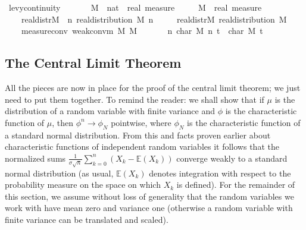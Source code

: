 \documentclass{article}
\theoremstyle{definition}
\renewcommand{\E}{\mathbb E}
\begin{document}
\begin{isabellebody}
\isamarkupfalse%
\ levy{\isacharunderscore}continuity{}{\isacharcolon}\isanewline
\ \ \isanewline
\ \ \ \ M\ {\isacharcolon}{\isacharcolon}\ {\isachardoublequoteopen}nat\ {\isasymRightarrow}\ real\ measure{\isachardoublequoteclose}\ \isanewline
\ \ \ \ M{\isacharprime}\ {\isacharcolon}{\isacharcolon}\ {\isachardoublequoteopen}real\ measure{\isachardoublequoteclose}\isanewline
\ \ \ \isanewline
\ \ \ \ real{\isacharunderscore}distr{\isacharunderscore}M\ {\isacharcolon}\ {\isachardoublequoteopen}{\isasymAnd}n{\isachardot}\ real{\isacharunderscore}distribution\ {\isacharparenleft}M\ n{\isacharparenright}{\isachardoublequoteclose}\ \isanewline
\ \ \ \ real{\isacharunderscore}distr{\isacharunderscore}M{\isacharprime}{\isacharcolon}\ {\isachardoublequoteopen}real{\isacharunderscore}distribution\ M{\isacharprime}{\isachardoublequoteclose}\ \isanewline
\ \ \ \ measure{\isacharunderscore}conv{\isacharcolon}\ {\isachardoublequoteopen}weak{\isacharunderscore}conv{\isacharunderscore}m\ M\ M{\isacharprime}{\isachardoublequoteclose}\isanewline
\ \ \isanewline
\ \ \ \ {\isachardoublequoteopen}{\isacharparenleft}{\isasymlambda}n{\isachardot}\ char\ {\isacharparenleft}M\ n{\isacharparenright}\ t{\isacharparenright}\ {\isacharminus}{\isacharminus}{\isacharminus}{\isacharminus}{\isachargreater}\ char\ M{\isacharprime}\ t{\isachardoublequoteclose}
\end{isabellebody}

\subsection{The Central Limit Theorem}

All the pieces are now in place for the proof of the central limit theorem; we just need to put them together. To remind the reader: we shall show that if $\mu$ is the distribution of a random variable with finite variance and $\phi$ is the characteristic function of $\mu$, then $\phi^n \rightarrow \phi_N$ pointwise, where $\phi_N$ is the characteristic function of a standard normal distribution. From this and facts proven earlier about characteristic functions of independent random variables it follows that the normalized sums $\frac{1}{\sigma \sqrt n} \sum_{k=0}^n (X_k - \E(X_k))$ converge weakly to a standard normal distribution (as usual, $\E(X_k)$ denotes integration with respect to the probability measure on the space on which $X_k$ is defined). For the remainder of this section, we assume without loss of generality that the random variables we work with have mean zero and variance one (otherwise a random variable with finite variance can be translated and scaled).
\end{document}
